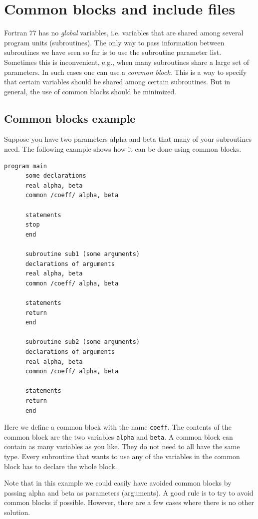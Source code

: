 \chapter{Common blocks and include files}

Fortran 77 has no \emph{global} variables, i.e. variables that are shared among several program units (subroutines). The only way to pass information between subroutines we have seen so far is to use the subroutine parameter list. Sometimes this is inconvenient, e.g., when many subroutines share a large set of parameters. In such cases one can use a \emph{common block}. This is a way to specify that certain variables should be shared among certain subroutines. But in general, the use of common blocks should be minimized.

\section{Common blocks example}

Suppose you have two parameters alpha and beta that many of your subroutines need. The following example shows how it can be done using common blocks.

\begin{lstlisting}[style=fortran77]
      program main
      some declarations
      real alpha, beta
      common /coeff/ alpha, beta

      statements
      stop
      end

      subroutine sub1 (some arguments)
      declarations of arguments
      real alpha, beta
      common /coeff/ alpha, beta

      statements
      return
      end

      subroutine sub2 (some arguments)
      declarations of arguments
      real alpha, beta
      common /coeff/ alpha, beta

      statements
      return
      end
\end{lstlisting}

Here we define a common block with the name \texttt{coeff}. The contents of the common block are the two variables \texttt{alpha} and \texttt{beta}. A common block can contain as many variables as you like. They do not need to all have the same type. Every subroutine that wants to use any of the variables in the common block has to declare the whole block.

Note that in this example we could easily have avoided common blocks by passing alpha and beta as parameters (arguments). A good rule is to try to avoid common blocks if possible. However, there are a few cases where there is no other solution.

